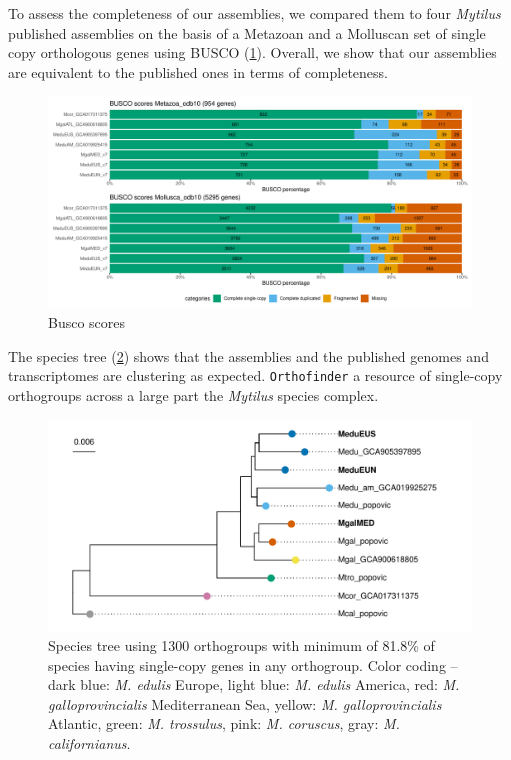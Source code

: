 \documentclass[11pt, a4paper]{article}
\begin{document}
\begin{landscape}
	
\end{landscape}


To assess the completeness of our assemblies, we compared them to four \textit{Mytilus} published assemblies on the basis of a Metazoan and a Molluscan set of single copy orthologous genes using BUSCO (\cref{fig:busco}).
Overall, we show that our assemblies are equivalent to the published ones in terms of completeness.

\begin{figure}[h]
	\includegraphics[width=\linewidth]{figures/Fig2_busco.pdf}
	\caption{Busco scores}
	\label{fig:busco}
\end{figure}


The species tree (\cref{fig:tree}) shows that the assemblies and the published genomes and transcriptomes are clustering as expected.
\texttt{Orthofinder}  a resource of single-copy orthogroups across a large part the \textit{Mytilus} species complex.


\begin{figure}[h]
	\includegraphics[width=\linewidth]{figures/Fig3_tree.pdf}
	\caption{Species tree using 1300 orthogroups with minimum of 81.8\% of species having single-copy genes in any orthogroup.
	Color coding -- dark blue: \textit{M. edulis} Europe, light blue: \textit{M. edulis} America,
	red: \textit{M. galloprovincialis} Mediterranean Sea, yellow: \textit{M. galloprovincialis} Atlantic,
	green: \textit{M. trossulus}, pink: \textit{M. coruscus}, gray: \textit{M. californianus}.
	}
	\label{fig:tree}
\end{figure}
\end{document}
